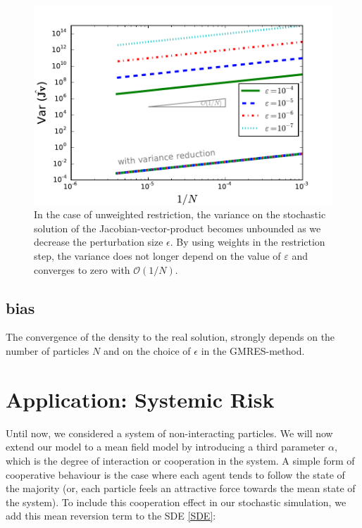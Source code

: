 \documentclass[]{article}
\theoremstyle{definition}
\begin{document}
\begin{figure}
\centering
\includegraphics[width=0.8\linewidth]{../Problems/Particles/checkSystem/plots/Var_N_eps_nw}
\caption[Effect of variance reduction]{In the case of unweighted restriction, the variance on the stochastic solution of the Jacobian-vector-product becomes unbounded as we decrease the perturbation size $\epsilon$. By using weights in the restriction step, the variance does not longer depend on the value of $\varepsilon$ and   converges to zero with $\mathcal{O}(1/ N)$.}
\label{Var_N}
\end{figure}

%

\subsection{bias}


The convergence of the density to the real solution, strongly depends on the number of particles $N$ and on the choice of $\epsilon$ in the GMRES-method. 














\section{Application: Systemic Risk}


Until now, we considered a system of non-interacting particles. We will now extend our model to a mean field model by introducing a third parameter $\alpha$, which is the degree of interaction or cooperation in the system. A simple form of cooperative behaviour is the case where each agent tends to follow the state of the majority (or, each particle feels an attractive force towards the mean state of the system). To include this cooperation effect in our stochastic simulation, we add this mean reversion term to the SDE \eqref{SDE}:
\end{document}

